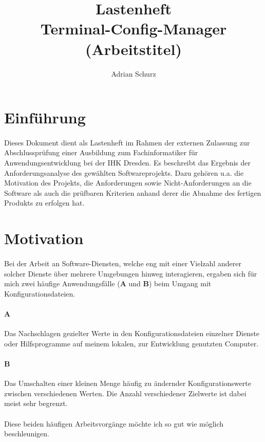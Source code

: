 \documentclass[a4paper,11pt]{article}
\author{Adrian Schurz}
\title{Lastenheft\\[0.2em]\smaller{}Terminal-Config-Manager (Arbeitstitel)}
\begin{document}
\maketitle
{}
\newpage
{}
\tableofcontents

\section{Einführung}
\paragraph{}
Dieses Dokument dient als Lastenheft im Rahmen der externen Zulassung
zur Abschlussprüfung einer Ausbildung zum Fachinformatiker für
Anwendungsentwicklung bei der IHK Dresden. Es beschreibt das Ergebnis der
Anforderungsanalyse des gewählten Softwareprojekts. Dazu gehören u.a. die
Motivation des Projekts, die Anforderungen sowie Nicht-Anforderungen an
die Software als auch die prüfbaren Kriterien anhand derer die Abnahme des
fertigen Produkts zu erfolgen hat.

\section{Motivation}
\paragraph{}
Bei der Arbeit an Software-Diensten, welche eng mit einer Vielzahl anderer
solcher Dienste über mehrere Umgebungen hinweg interagieren, ergaben sich
für mich zwei häufige Anwendungsfälle (\textbf{A} und \textbf{B}) beim Umgang mit
Konfigurationsdateien.
\paragraph{A}
Das Nachschlagen gezielter Werte in den Konfigurationsdateien
einzelner Dienste oder Hilfsprogramme auf meinem lokalen, zur Entwicklung
genutzten Computer.
\paragraph{B}
Das Umschalten einer kleinen Menge häufig zu ändernder Konfigurationswerte
zwischen verschiedenen Werten. Die Anzahl verschiedener Zielwerte ist dabei
meist sehr begrenzt.
\paragraph{}
Diese beiden häufigen Arbeitsvorgänge möchte ich so gut wie möglich beschleunigen.
\end{document}
